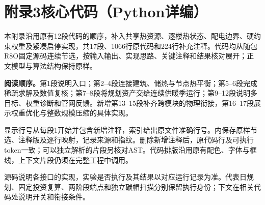 \clearpage
\section*{附录3\quad 核心代码（Python详编）}
\label{appendix:code}

本附录沿用原有12段代码的顺序，补入共享热资源、逐楼热状态、配电边界、硬约束权重及紧凑启停实现，共17段、1066行原代码和224行补充注释。代码均从随包R8O固定源码连续节选，按输入输出、实现思路、关键注释和结果核对展开；正文模型与算法结构保持原样。

\textbf{阅读顺序。}第1段说明入口；第2--4段连接建筑、储热与节点热平衡；第5--6段完成稀疏求解及数值复核；第7--8段将规划资产交给连续供暖季运行；第9--12段说明多目标、权重诊断和管网反馈。新增第13--15段补齐跨模块的物理衔接，第16--17段展示权重优化与整数规模压缩的具体实现。

显示行号从每段1开始并包含新增注释，索引给出原文件准确行号。内保存原样节选、注释版及逐行映射，记录来源和指纹。删除新增注释后，原代码行及可执行token一致；可以独立解析的片段另核对AST。代码排版沿用原有配色、字体与框线，上下文片段仍须在完整工程中调用。

源码说明各接口的实现，实验是否执行及其结果以对应运行记录为准。代表日规划、固定投资复算、两阶段端点和独立碳帽扫描分别保留执行身份；下文在相关代码处说明开关和衔接条件。

